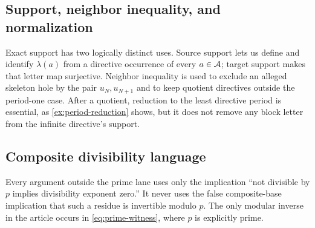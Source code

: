\subsection{Support, neighbor inequality, and normalization}

Exact support has two logically distinct uses.  Source support lets us
define and identify $\lambda(a)$ from a directive occurrence of every
$a\in\mathcal A$; target support makes that letter map surjective.  Neighbor
inequality is used to exclude an alleged skeleton hole by the pair
$u_N,u_{N+1}$ and to keep quotient directives outside the period-one case.
After a quotient, reduction to the least directive period is essential, as
\cref{ex:period-reduction} shows, but it does not remove any block letter
from the infinite directive's support.

\subsection{Composite divisibility language}

Every argument outside the prime lane uses only the implication
``not divisible by $p$ implies divisibility exponent zero.''  It never
uses the false composite-base implication that such a residue is invertible
modulo $p$.  The only modular inverse in the article occurs in
\cref{eq:prime-witness}, where $p$ is explicitly prime.
